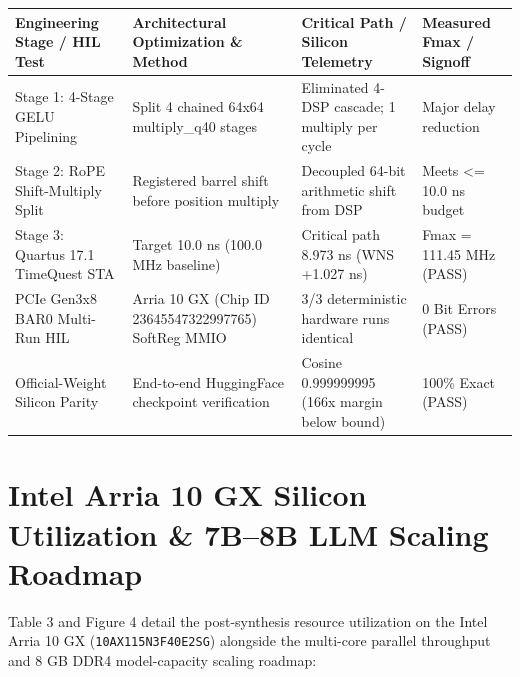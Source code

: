\documentclass[11pt,a4paper]{article}
\begin{document}
{\footnotesize\renewcommand{\arraystretch}{1.14}\begin{longtable}{@{}L{0.23\textwidth}L{0.27\textwidth}L{0.24\textwidth}L{0.16\textwidth}@{}}\toprule

\textbf{Engineering Stage /\allowbreak{} HIL Test} & \textbf{Architectural Optimization \& Method} & \textbf{Critical Path /\allowbreak{} Silicon Telemetry} & \textbf{Measured Fmax /\allowbreak{} Signoff}\\\midrule\endhead

Stage 1: 4-Stage GELU Pipelining & Split 4 chained 64x64 multiply\_\allowbreak{}q40 stages & Eliminated 4-DSP cascade; 1 multiply per cycle & Major delay reduction\\[2pt]

Stage 2: RoPE Shift-Multiply Split & Registered barrel shift before position multiply & Decoupled 64-bit arithmetic shift from DSP & Meets <=\allowbreak{} 10.0 ns budget\\[2pt]

Stage 3: Quartus 17.1 TimeQuest STA & Target 10.0 ns (\allowbreak{}100.0 MHz baseline)\allowbreak{} & Critical path 8.973 ns (\allowbreak{}WNS +\allowbreak{}1.027 ns)\allowbreak{} & Fmax =\allowbreak{} 111.45 MHz (\allowbreak{}PASS)\allowbreak{}\\[2pt]

PCIe Gen3x8 BAR0 Multi-Run HIL & Arria 10 GX (\allowbreak{}Chip ID 23645547\allowbreak{}32299776\allowbreak{}5)\allowbreak{} SoftReg MMIO & 3/\allowbreak{}3 deterministic hardware runs identical & 0 Bit Errors (\allowbreak{}PASS)\allowbreak{}\\[2pt]

Official-Weight Silicon Parity & End-to-end HuggingFace checkpoint verification & Cosine 0.99999999\allowbreak{}5 (\allowbreak{}166x margin below bound)\allowbreak{} & 100\% Exact (\allowbreak{}PASS)\allowbreak{}\\[2pt]

\bottomrule\end{longtable}}

\section{Intel Arria 10 GX Silicon Utilization \& 7B--8B LLM Scaling Roadmap}

Table 3 and Figure 4 detail the post-synthesis resource utilization on the Intel Arria 10 GX (\texttt{10AX115N3F40E2SG}) alongside the multi-core parallel throughput and 8 GB DDR4 model-capacity scaling roadmap:
\end{document}
